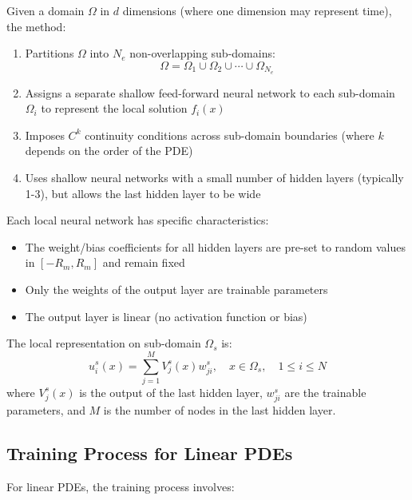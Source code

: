 \documentclass[11pt,a4paper]{article}
\begin{document}
Given a domain $\Omega$ in $d$ dimensions (where one dimension may represent time), the method:

\begin{enumerate}
    \item Partitions $\Omega$ into $N_e$ non-overlapping sub-domains:
    \begin{equation}
        \Omega = \Omega_1 \cup \Omega_2 \cup \cdots \cup \Omega_{N_e}
    \end{equation}
    
    \item Assigns a separate shallow feed-forward neural network to each sub-domain $\Omega_i$ to represent the local solution $f_i(x)$
    
    \item Imposes $C^k$ continuity conditions across sub-domain boundaries (where $k$ depends on the order of the PDE)
    
    \item Uses shallow neural networks with a small number of hidden layers (typically 1-3), but allows the last hidden layer to be wide
\end{enumerate}

Each local neural network has specific characteristics:
\begin{itemize}
    \item The weight/bias coefficients for all hidden layers are pre-set to random values in $[-R_m, R_m]$ and remain fixed
    \item Only the weights of the output layer are trainable parameters
    \item The output layer is linear (no activation function or bias)
\end{itemize}

The local representation on sub-domain $\Omega_s$ is:
\begin{equation}
    u^s_i(x) = \sum_{j=1}^{M} V^s_j(x) w^s_{ji}, \quad x \in \Omega_s, \quad 1 \leq i \leq N
\end{equation}
where $V^s_j(x)$ is the output of the last hidden layer, $w^s_{ji}$ are the trainable parameters, and $M$ is the number of nodes in the last hidden layer.

\subsection{Training Process for Linear PDEs}
For linear PDEs, the training process involves:
\end{document}
